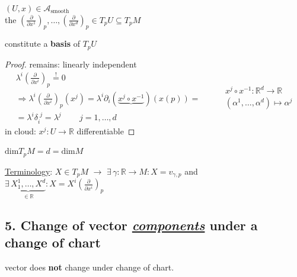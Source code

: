 	\begin{definition}
		$(U,x) \in \mathcal{A}_{\text{smooth}}$ \\
		the $\left( \frac{ \partial }{ \partial x^1} \right)_p , \dots , \left( \frac{ \partial }{ \partial x^d} \right)_p \in T_pU \subseteq T_pM$
		
		constitute a \textbf{basis} of $T_pU$
		
	\end{definition}
	
	\begin{proof} remains: linearly independent 
		\[
		\begin{gathered}
		\lambda^i \left( \frac{ \partial }{ \partial x^i} \right)_p \overset{!}{=} 0  \\
		\Longrightarrow \lambda^i \left( \frac{ \partial }{ \partial x^i} \right)_p(x^j) = \lambda^i \partial_i (\underbrace{ x^j \circ x^{-1} }_{} )( x(p)) = \\
		= \lambda^i \delta_i^{\,\,j} = \lambda^j \quad \quad \, j = 1 , \dots , d
		\end{gathered} \quad \quad \, \begin{gathered}
		x^j \circ x^{-1} : \mathbb{R}^d \to \mathbb{R} \\
		(\alpha^1 , \dots , \alpha^d) \mapsto \alpha^j 
		\end{gathered}
		\]
		in cloud: $x^j : U \to \mathbb{R}$ differentiable
		
		
		
		
	\end{proof}
	
	
	\begin{corollary}
		$ \text{dim}T_pM = d = \text{dim}M$
	\end{corollary}
	
	\underline{Terminology}: $X \in T_pM$ $\to $ $\exists \, \gamma : \mathbb{R} \to M : X = v_{\gamma,p}$ and \\
	 $\exists \, \underbrace{ X_1^1 , \dots , X^d }_{\in \mathbb{R} } : X = X^i \left( \frac{ \partial }{ \partial x^i} \right)_p$
	
	
	
	\subsection{5. Change of vector \emph{\underline{components}} under a change of chart}
	
	 vector does \textbf{not} change under change of chart.
	
